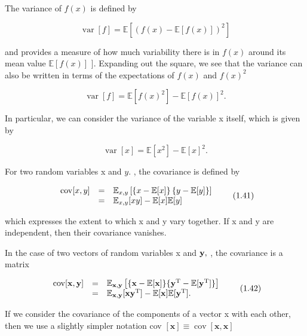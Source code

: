 \documentclass[
  10
]{article}
\begin{document}
The variance of \(f ( x )\) is defined by

\[
\operatorname{var} [ f ] = \mathbb {E} \left[ (f (x) - \mathbb {E} [ f (x) ]) ^ {2} \right]\tag{1.38}
\]

and provides a measure of how much variability there is in \(f ( x )\)
around its mean value \(\mathbb { E } [ f ( x ) ]\) {]}. Expanding out
the square, we see that the variance can also be written in terms of the
expectations of \(f ( x )\) and \(f ( x ) ^ { 2 }\)

\[
\operatorname{var} [ f ] = \mathbb {E} [ f (x) ^ {2} ] - \mathbb {E} [ f (x) ] ^ {2}.\tag{1.39}
\]

In particular, we can consider the variance of the variable x itself,
which is given by

\[
\operatorname{var} [ x ] = \mathbb {E} [ x ^ {2} ] - \mathbb {E} [ x ] ^ {2}.\tag{1.40}
\]

For two random variables x and \(y .\) , the covariance is defined by

\[
\begin{array}{r c l} \operatorname{cov} [ x, y ] & = & \mathbb {E} _ {x, y} \left[ \left\{x - \mathbb {E} [ x ] \right\} \left\{y - \mathbb {E} [ y ] \right\} \right] \\ & = & \mathbb {E} _ {x, y} [ x y ] - \mathbb {E} [ x ] \mathbb {E} [ y ] \end{array}\tag{1.41}
\]

which expresses the extent to which x and y vary together. If x and y
are independent, then their covariance vanishes.

In the case of two vectors of random variables x and \({ \bf y } ,\) ,
the covariance is a matrix

\[
\begin{array}{r c l} \operatorname{cov} [ \mathbf {x}, \mathbf {y} ] & = & \mathbb {E} _ {\mathbf {x}, \mathbf {y}} \left[ \{\mathbf {x} - \mathbb {E} [ \mathbf {x} ] \} \{\mathbf {y} ^ {\mathrm{T}} - \mathbb {E} [ \mathbf {y} ^ {\mathrm{T}} ] \} \right] \\ & = & \mathbb {E} _ {\mathbf {x}, \mathbf {y}} [ \mathbf {x y} ^ {\mathrm{T}} ] - \mathbb {E} [ \mathbf {x} ] \mathbb {E} [ \mathbf {y} ^ {\mathrm{T}} ]. \end{array}\tag{1.42}
\]

If we consider the covariance of the components of a vector x with each
other, then we use a slightly simpler notation cov
\([ \mathbf { x } ] \equiv \operatorname { c o v } [ \mathbf { x } , \mathbf { x } ]\)
\end{document}
